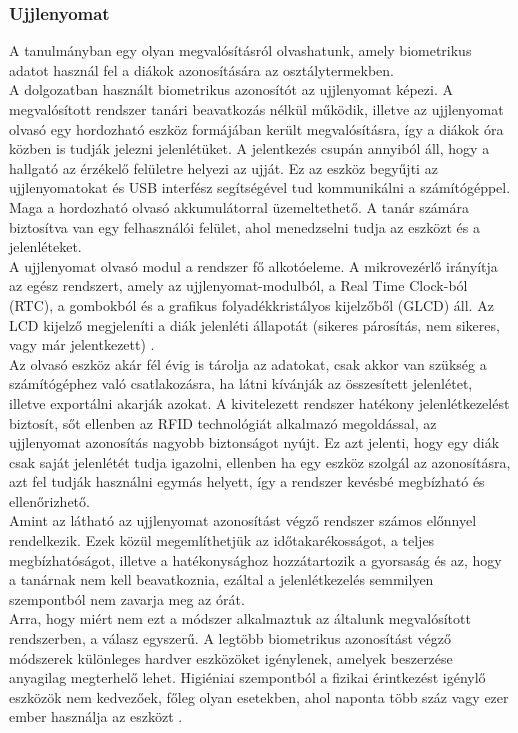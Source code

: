 \documentclass[12pt]{article}
\numberwithin{figure}{section}
\numberwithin{equation}{section}
\begin{document}
\subsubsection{Ujjlenyomat}
A \cite{4} tanulmányban egy olyan megvalósításról olvashatunk, amely biometrikus adatot használ fel a diákok azonosítására az osztálytermekben. \\
A dolgozatban használt biometrikus azonosítót az ujjlenyomat képezi. A megvalósított rendszer tanári beavatkozás nélkül működik, illetve az ujjlenyomat olvasó egy hordozható eszköz formájában került megvalósításra, így a diákok óra közben is tudják jelezni jelenlétüket. A jelentkezés csupán annyiból áll, hogy a hallgató az érzékelő felületre helyezi az ujját. Ez az eszköz begyűjti az ujjlenyomatokat és USB interfész segítségével tud kommunikálni a számítógéppel. Maga a hordozható olvasó akkumulátorral üzemeltethető. A tanár számára biztosítva van egy felhasználói felület, ahol menedzselni tudja az eszközt és a jelenléteket. \\
A ujjlenyomat olvasó modul a rendszer fő alkotóeleme. A mikrovezérlő irányítja az egész rendszert, amely az ujjlenyomat-modulból, a Real Time Clock-ból (RTC), a gombokból és a grafikus folyadékkristályos kijelzőből (GLCD) áll. Az LCD kijelző megjeleníti a diák jelenléti állapotát (sikeres párosítás, nem sikeres, vagy már jelentkezett) \cite{4}.  \\
Az olvasó eszköz akár fél évig is tárolja az adatokat, csak akkor van szükség a számítógéphez való csatlakozásra, ha látni kívánják az összesített jelenlétet, illetve exportálni akarják azokat.
A kivitelezett rendszer hatékony jelenlétkezelést biztosít, sőt ellenben az RFID technológiát alkalmazó megoldással, az ujjlenyomat azonosítás nagyobb biztonságot nyújt. Ez azt jelenti, hogy egy diák csak saját jelenlétét tudja igazolni, ellenben ha egy eszköz szolgál az azonosításra, azt fel tudják használni egymás helyett, így a rendszer kevésbé megbízható és ellenőrizhető.\\
Amint az látható az ujjlenyomat azonosítást végző rendszer számos előnnyel rendelkezik. Ezek közül megemlíthetjük az időtakarékosságot, a teljes megbízhatóságot, illetve a hatékonysághoz hozzátartozik a gyorsaság és az, hogy a tanárnak nem kell beavatkoznia, ezáltal a jelenlétkezelés semmilyen szempontból nem zavarja meg az órát.\\
Arra, hogy miért nem ezt a módszer alkalmaztuk az általunk megvalósított rendszerben, a válasz egyszerű. A legtöbb biometrikus azonosítást végző módszerek különleges hardver eszközöket igénylenek, amelyek beszerzése anyagilag megterhelő lehet. Higiéniai szempontból a fizikai érintkezést igénylő eszközök nem kedvezőek, főleg olyan esetekben, ahol naponta több száz vagy ezer ember használja az eszközt \cite{6}.  
\end{document}

